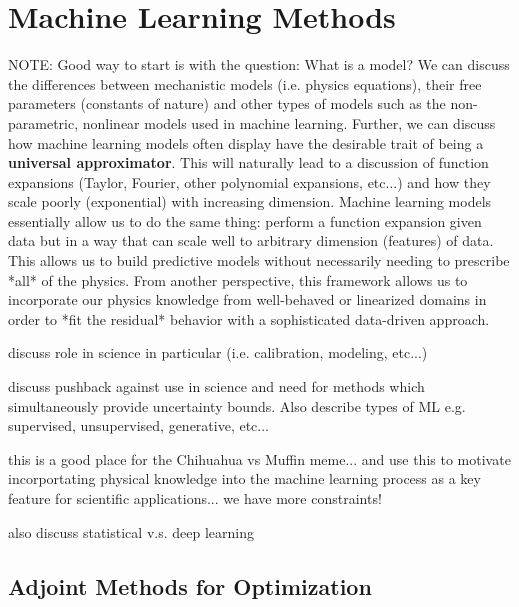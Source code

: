 \chapter{Machine Learning Methods}

NOTE: Good way to start is with the question: What is a model? We can discuss the differences between mechanistic models (i.e. physics equations), their free parameters (constants of nature) and other types of models such as the non-parametric, nonlinear models used in machine learning. Further, we can discuss how machine learning models often display have the desirable trait of being a \textbf{universal approximator}. This will naturally lead to a discussion of function expansions (Taylor, Fourier, other polynomial expansions, etc...) and how they scale poorly (exponential) with increasing dimension. Machine learning models essentially allow us to do the same thing: perform a function expansion given data but in a way that can scale well to arbitrary dimension (features) of data. This allows us to build predictive models without necessarily needing to prescribe *all* of the physics. From another perspective, this framework allows us to incorporate our physics knowledge from well-behaved or linearized domains in order to *fit the residual* behavior with a sophisticated data-driven approach.

discuss role in science in particular (i.e. calibration, modeling, etc...)

discuss pushback against use in science and need for methods which simultaneously provide uncertainty bounds. Also describe types of ML e.g. supervised, unsupervised, generative, etc...

this is a good place for the Chihuahua vs Muffin meme... and use this to motivate incorportating physical knowledge into the machine learning process as a key feature for scientific applications... we have more constraints!

also discuss statistical v.s. deep learning



\section{Adjoint Methods for Optimization}

